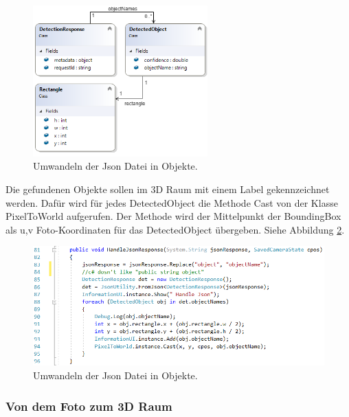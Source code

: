 \begin{figure}[H]
	\centering
	\includegraphics[width=0.6\textwidth]{images/dia_json.PNG}
	\caption[]{Umwandeln der Json Datei in Objekte.}
	\label{dia:jsonClasses}
\end{figure}

Die gefundenen Objekte sollen im 3D Raum mit einem Label gekennzeichnet werden. 
Dafür wird für jedes DetectedObject die Methode Cast von der Klasse PixelToWorld aufgerufen. Der Methode wird der Mittelpunkt der BoundingBox als u,v Foto-Koordinaten für das DetectedObject übergeben. Siehe Abbildung \ref{code:handlejson}.

\begin{figure}[H]
	\centering
	\includegraphics[width=1\textwidth]{images/code_handleJson.PNG}
	\caption[]{Umwandeln der Json Datei in Objekte.}
	\label{code:handlejson}
\end{figure}

\subsubsection{Von dem Foto zum 3D Raum}

